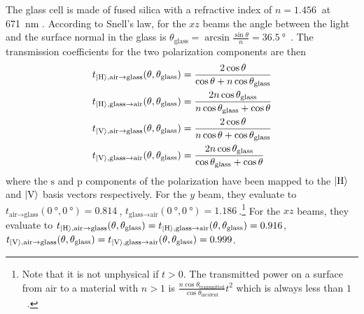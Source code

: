 The glass cell is made of fused silica with a refractive index of $n = \SI{1.456}{}$ at \SI{671}{\nano\meter} \cite{malitson_interspecimen_1965}. According to Snell's law, for the $xz$ beams the angle between the light and the surface normal in the glass is $\theta_\text{glass} = \arcsin \frac{\sin \theta}{n} = \SI{36.5}{\degree}$~\cite{demtroder_elektromagnetische_2013}. The transmission coefficients for the two polarization components are then~\cite{demtroder_elektromagnetische_2013}
\begin{align}\label{eq:fresnel}
    \begin{split}
        t_{\Ket{\text{H}}, \text{air} \rightarrow \text{glass}}(\theta, \theta_\text{glass})  &= \frac{2 \cos \theta}{\cos \theta + n \cos \theta_\text{glass}}\\
        t_{\Ket{\text{H}}, \text{glass} \rightarrow \text{air}}(\theta, \theta_\text{glass})  &= \frac{2n \cos \theta_\text{glass}}{n \cos \theta_\text{glass} + \cos \theta} \\
        t_{\Ket{\text{V}}, \text{air} \rightarrow \text{glass}}(\theta, \theta_\text{glass})  &= \frac{2 \cos \theta}{n \cos \theta + \cos \theta_\text{glass}}\\ 
        t_{\Ket{\text{V}}, \text{glass} \rightarrow \text{air}}(\theta, \theta_\text{glass})  &= \frac{2 n \cos \theta_\text{glass}}{\cos \theta_\text{glass} + \cos \theta}\\ 
    \end{split}
\end{align}
where the $\text{s}$ and $\text{p}$ components of the polarization have been mapped to the $\Ket{\text{H}}$ and $\Ket{\text{V}}$ basis vectors respectively. For the $y$ beam, they evaluate to $t_{\text{air} \rightarrow \text{glass}}(\SI{0}{\degree}, \SI{0}{\degree}) = \SI{0.814}{}$, $t_{\text{glass} \rightarrow \text{air}}(\SI{0}{\degree}, \SI{0}{\degree}) = \SI{1.186}{}$.\footnote{Note that it is not unphysical if $t > 0$. The transmitted power on a surface from air to a material with $n > 1$ is $\frac{n \cos \theta_\text{transmitted}}{\cos \theta_\text{incident}}t^2$ which is always less than $1$~\cite{demtroder_elektromagnetische_2013}.} For the $xz$ beams, they evaluate to $t_{\Ket{\text{H}}, \text{air} \rightarrow \text{glass}}(\theta, \theta_\text{glass}) = t_{\Ket{\text{H}}, \text{glass} \rightarrow \text{air}}(\theta, \theta_\text{glass}) = \SI{0.916}{}$, $t_{\Ket{\text{V}}, \text{air} \rightarrow \text{glass}}(\theta, \theta_\text{glass}) = t_{\Ket{\text{V}}, \text{glass} \rightarrow \text{air}}(\theta, \theta_\text{glass}) = \SI{0.999}{}$.

